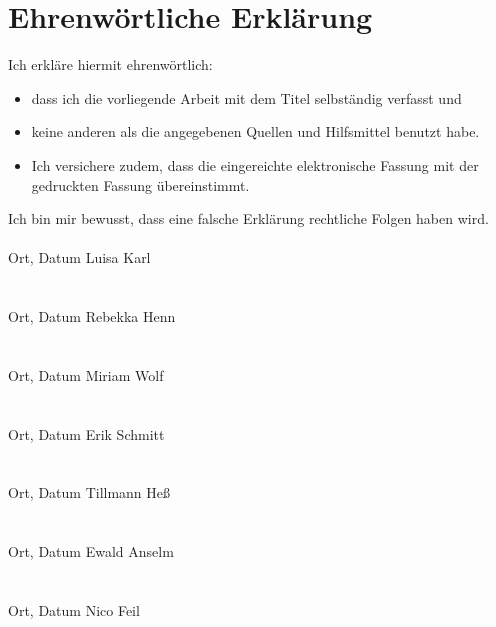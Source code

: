 \clearpage
\chapter*{Ehrenwörtliche Erklärung}	



Ich erkläre hiermit ehrenwörtlich: 

\begin{itemize}
	\item dass ich die vorliegende Arbeit mit dem Titel \textit{\DerTitelDerArbeit} selbständig verfasst und
	\item keine anderen als die angegebenen Quellen und Hilfsmittel benutzt habe. 
	\item Ich versichere zudem, dass die eingereichte elektronische Fassung mit der gedruckten Fassung übereinstimmt.
\end{itemize}
Ich bin mir bewusst, dass eine falsche Erklärung rechtliche Folgen haben wird.
\vspace{1cm}
\\
\\
Ort, Datum \hfill Luisa Karl
\\
\\
\\

Ort, Datum \hfill Rebekka Henn
\\
\\
\\

Ort, Datum \hfill Miriam Wolf
\\
\\
\\

Ort, Datum \hfill Erik Schmitt
\\
\\
\\

Ort, Datum \hfill Tillmann Heß
\\
\\
\\

Ort, Datum \hfill Ewald Anselm
\\
\\
\\

Ort, Datum \hfill Nico Feil
 